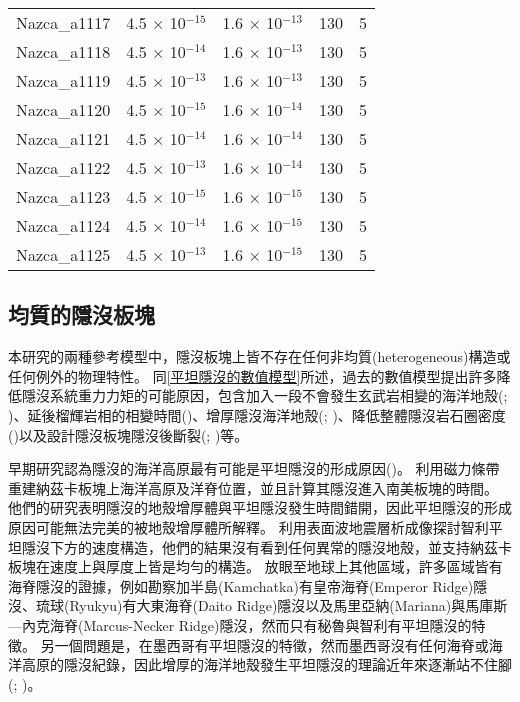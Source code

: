 \begin{table}[htp]
\begin{tabular}{|lllll|}
    Nazca\_a1117 & 4.5 $\times$ 10$^{-15}$ & 1.6 $\times$ 10$^{-13}$ & 130       & 5            \\
    Nazca\_a1118 & 4.5 $\times$ 10$^{-14}$ & 1.6 $\times$ 10$^{-13}$ & 130       & 5            \\
    Nazca\_a1119 & 4.5 $\times$ 10$^{-13}$ & 1.6 $\times$ 10$^{-13}$ & 130       & 5            \\
    Nazca\_a1120 & 4.5 $\times$ 10$^{-15}$ & 1.6 $\times$ 10$^{-14}$ & 130       & 5            \\
    Nazca\_a1121 & 4.5 $\times$ 10$^{-14}$ & 1.6 $\times$ 10$^{-14}$ & 130       & 5            \\
    Nazca\_a1122 & 4.5 $\times$ 10$^{-13}$ & 1.6 $\times$ 10$^{-14}$ & 130       & 5            \\
    Nazca\_a1123 & 4.5 $\times$ 10$^{-15}$ & 1.6 $\times$ 10$^{-15}$ & 130       & 5            \\
    Nazca\_a1124 & 4.5 $\times$ 10$^{-14}$ & 1.6 $\times$ 10$^{-15}$ & 130       & 5            \\
    Nazca\_a1125 & 4.5 $\times$ 10$^{-13}$ & 1.6 $\times$ 10$^{-15}$ & 130       & 5            \\ \hline
    \end{tabular}
\end{table}

\newpage
\subsection{均質的隱沒板塊}
本研究的兩種參考模型中，隱沒板塊上皆不存在任何非均質(heterogeneous)構造或任何例外的物理特性。
同\ref{平坦隱沒的數值模型}所述，過去的數值模型提出許多降低隱沒系統重力力矩的可能原因，包含加入一段不會發生玄武岩相變的海洋地殼(\citealp{Liu2016}; \citealp{Gerya2009})、延後榴輝岩相的相變時間(\citealp{van2002role})、增厚隱沒海洋地殼(\citealp{Liu2016}; \citealp{axen2018basal})、降低整體隱沒岩石圈密度(\citealp{Gerya2009})以及設計隱沒板塊隱沒後斷裂(\citealp{Liu2016}; \citealp{axen2018basal})等。

早期研究認為隱沒的海洋高原最有可能是平坦隱沒的形成原因(\citealp{gutscher2002andean})。
\citealp{Skinner2013}利用磁力條帶重建納茲卡板塊上海洋高原及洋脊位置，並且計算其隱沒進入南美板塊的時間。
他們的研究表明隱沒的地殼增厚體與平坦隱沒發生時間錯開，因此平坦隱沒的形成原因可能無法完美的被地殼增厚體所解釋。
\citealp{Marot2014}利用表面波地震層析成像探討智利平坦隱沒下方的速度構造，他們的結果沒有看到任何異常的隱沒地殼，並支持納茲卡板塊在速度上與厚度上皆是均勻的構造。
放眼至地球上其他區域，許多區域皆有海脊隱沒的證據，例如勘察加半島(Kamchatka)有皇帝海脊(Emperor Ridge)隱沒、琉球(Ryukyu)有大東海脊(Daito Ridge)隱沒以及馬里亞納(Mariana)與馬庫斯—內克海脊(Marcus-Necker Ridge)隱沒，然而只有秘魯與智利有平坦隱沒的特徵。
另一個問題是，在墨西哥有平坦隱沒的特徵，然而墨西哥沒有任何海脊或海洋高原的隱沒紀錄，因此增厚的海洋地殼發生平坦隱沒的理論近年來逐漸站不住腳(\citealp{schellart2020control}; \citealp{Schellart2021})。

